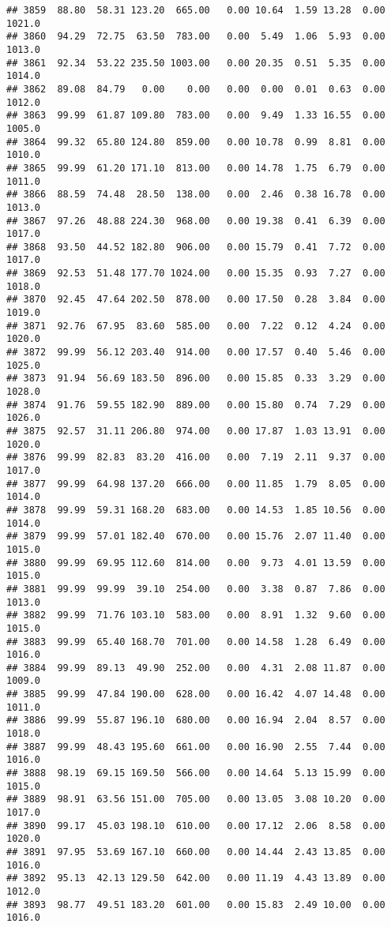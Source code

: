 \documentclass{article}\usepackage{graphicx, color}
\makeatletter
\newenvironment{kframe}{%
 \def\at@end@of@kframe{}%
 \ifinner\ifhmode%
  \def\at@end@of@kframe{\end{minipage}}%
  \begin{minipage}{\columnwidth}%
 \fi\fi%
 \def\FrameCommand##1{\hskip\@totalleftmargin \hskip-\fboxsep
 \colorbox{shadecolor}{##1}\hskip-\fboxsep
     \hskip-\linewidth \hskip-\@totalleftmargin \hskip\columnwidth}%
 \MakeFramed {\advance\hsize-\width
   \@totalleftmargin\z@ \linewidth\hsize
   \@setminipage}}%
 {\par\unskip\endMakeFramed%
 \at@end@of@kframe}
\newenvironment{knitrout}{}{} %
\makeatother
\begin{document}
\begin{knitrout}
\begin{kframe}
\begin{verbatim}
## 3859  88.80  58.31 123.20  665.00   0.00 10.64  1.59 13.28  0.00 1021.0
## 3860  94.29  72.75  63.50  783.00   0.00  5.49  1.06  5.93  0.00 1013.0
## 3861  92.34  53.22 235.50 1003.00   0.00 20.35  0.51  5.35  0.00 1014.0
## 3862  89.08  84.79   0.00    0.00   0.00  0.00  0.01  0.63  0.00 1012.0
## 3863  99.99  61.87 109.80  783.00   0.00  9.49  1.33 16.55  0.00 1005.0
## 3864  99.32  65.80 124.80  859.00   0.00 10.78  0.99  8.81  0.00 1010.0
## 3865  99.99  61.20 171.10  813.00   0.00 14.78  1.75  6.79  0.00 1011.0
## 3866  88.59  74.48  28.50  138.00   0.00  2.46  0.38 16.78  0.00 1013.0
## 3867  97.26  48.88 224.30  968.00   0.00 19.38  0.41  6.39  0.00 1017.0
## 3868  93.50  44.52 182.80  906.00   0.00 15.79  0.41  7.72  0.00 1017.0
## 3869  92.53  51.48 177.70 1024.00   0.00 15.35  0.93  7.27  0.00 1018.0
## 3870  92.45  47.64 202.50  878.00   0.00 17.50  0.28  3.84  0.00 1019.0
## 3871  92.76  67.95  83.60  585.00   0.00  7.22  0.12  4.24  0.00 1020.0
## 3872  99.99  56.12 203.40  914.00   0.00 17.57  0.40  5.46  0.00 1025.0
## 3873  91.94  56.69 183.50  896.00   0.00 15.85  0.33  3.29  0.00 1028.0
## 3874  91.76  59.55 182.90  889.00   0.00 15.80  0.74  7.29  0.00 1026.0
## 3875  92.57  31.11 206.80  974.00   0.00 17.87  1.03 13.91  0.00 1020.0
## 3876  99.99  82.83  83.20  416.00   0.00  7.19  2.11  9.37  0.00 1017.0
## 3877  99.99  64.98 137.20  666.00   0.00 11.85  1.79  8.05  0.00 1014.0
## 3878  99.99  59.31 168.20  683.00   0.00 14.53  1.85 10.56  0.00 1014.0
## 3879  99.99  57.01 182.40  670.00   0.00 15.76  2.07 11.40  0.00 1015.0
## 3880  99.99  69.95 112.60  814.00   0.00  9.73  4.01 13.59  0.00 1015.0
## 3881  99.99  99.99  39.10  254.00   0.00  3.38  0.87  7.86  0.00 1013.0
## 3882  99.99  71.76 103.10  583.00   0.00  8.91  1.32  9.60  0.00 1015.0
## 3883  99.99  65.40 168.70  701.00   0.00 14.58  1.28  6.49  0.00 1016.0
## 3884  99.99  89.13  49.90  252.00   0.00  4.31  2.08 11.87  0.00 1009.0
## 3885  99.99  47.84 190.00  628.00   0.00 16.42  4.07 14.48  0.00 1011.0
## 3886  99.99  55.87 196.10  680.00   0.00 16.94  2.04  8.57  0.00 1018.0
## 3887  99.99  48.43 195.60  661.00   0.00 16.90  2.55  7.44  0.00 1016.0
## 3888  98.19  69.15 169.50  566.00   0.00 14.64  5.13 15.99  0.00 1015.0
## 3889  98.91  63.56 151.00  705.00   0.00 13.05  3.08 10.20  0.00 1017.0
## 3890  99.17  45.03 198.10  610.00   0.00 17.12  2.06  8.58  0.00 1020.0
## 3891  97.95  53.69 167.10  660.00   0.00 14.44  2.43 13.85  0.00 1016.0
## 3892  95.13  42.13 129.50  642.00   0.00 11.19  4.43 13.89  0.00 1012.0
## 3893  98.77  49.51 183.20  601.00   0.00 15.83  2.49 10.00  0.00 1016.0

\end{verbatim}
\end{kframe}
\end{knitrout}
\end{document}
